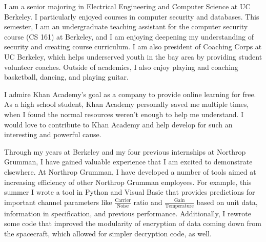 \documentclass[11pt, a4paper]{awesome-cv}
\begin{document}
\makecvheader

\makelettertitle

\begin{cvletter}
I am a senior majoring in Electrical Engineering and Computer Science at UC Berkeley. I particularly enjoyed courses in computer security and databases. This semester, I am an undergraduate teaching assistant for the computer security course (CS 161) at Berkeley, and I am enjoying deepening my understanding of security and creating course curriculum. I am also president of Coaching Corps at UC Berkeley, which helps underserved youth in the bay area by providing student volunteer coaches. Outside of academics, I also enjoy playing and coaching basketball, dancing, and playing guitar.

I admire Khan Academy's goal as a company to provide online learning for free. As a high school student, Khan Academy personally saved me multiple times, when I found the normal resources weren't enough to help me understand. I would love to contribute to Khan Academy and help develop for such an interesting and powerful cause.

Through my years at Berkeley and my four previous internships at Northrop Grumman, I have gained valuable experience that I am excited to demonstrate elsewhere. At Northrop Grumman, I have developed a number of tools aimed at increasing efficiency of other Northrop Grumman employees. For example, this summer I wrote a tool in Python and Visual Basic that provides predictions for important channel parameters like $\frac{\text{Carrier}}{\text{Noise}}$ ratio and $\frac{\text{Gain}}{\text{Temperature}}$ based on unit data, information in specification, and previous performance. Additionally, I rewrote some code that improved the modularity of encryption of data coming down from the spacecraft, which allowed for simpler decryption code, as well.

\end{cvletter}

\makeletterclosing
\end{document}
